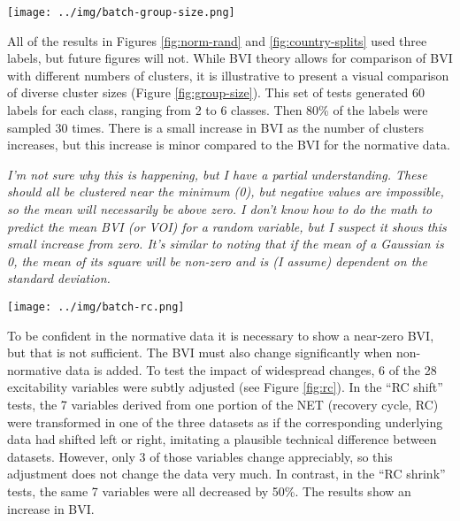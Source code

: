 \documentclass[12pt]{article}
\begin{document}
\pagebreak

\begin{figure*}
  \centering
       \texttt{[image: ../img/batch-group-size.png]}
         \caption{}
  \label{fig:group-size}
\end{figure*}

All of the results in Figures \ref{fig:norm-rand} and \ref{fig:country-splits} used three labels, but future figures will not. While BVI theory allows for comparison of BVI with different numbers of clusters, it is illustrative to present a visual comparison of diverse cluster sizes (Figure \ref{fig:group-size}). This set of tests generated 60 labels for each class, ranging from 2 to 6 classes. Then 80\% of the labels were sampled 30 times. There is a small increase in BVI as the number of clusters increases, but this increase is minor compared to the BVI for the normative data.

\emph{I'm not sure why this is happening, but I have a partial understanding. These should all be clustered near the minimum (0), but negative values are impossible, so the mean will necessarily be above zero. I don't know how to do the math to predict the mean BVI (or VOI) for a random variable, but I suspect it shows this small increase from zero. It's similar to noting that if the mean of a Gaussian is 0, the mean of its square will be non-zero and is (I assume) dependent on the standard deviation.}

\pagebreak

\begin{figure*}
  \centering
       \texttt{[image: ../img/batch-rc.png]}
         \caption{}
  \label{fig:rc}
\end{figure*}

To be confident in the normative data it is necessary to show a near-zero BVI, but that is not sufficient. The BVI must also change significantly when non-normative data is added. To test the impact of widespread changes, 6 of the 28 excitability variables were subtly adjusted (see Figure \ref{fig:rc}). In the ``RC shift'' tests, the 7 variables derived from one portion of the NET (recovery cycle, RC) were transformed in one of the three datasets as if the corresponding underlying data had shifted left or right, imitating a plausible technical difference between datasets. However, only 3 of those variables change appreciably, so this adjustment does not change the data very much. In contrast, in the ``RC shrink'' tests, the same 7 variables were all decreased by 50\%. The results show an increase in BVI.
\end{document}
